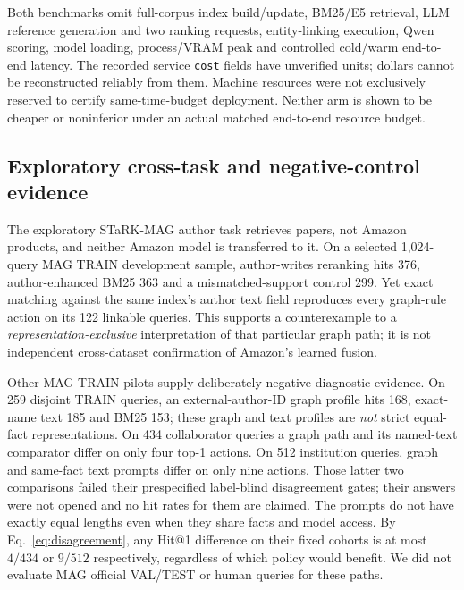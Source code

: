  Both benchmarks omit full-corpus index build/update, BM25/E5 retrieval,
 LLM reference generation and two ranking requests, entity-linking
 execution, Qwen scoring, model loading, process/VRAM peak and controlled
 cold/warm end-to-end latency. The recorded service \texttt{cost} fields
 have unverified units; dollars cannot be reconstructed reliably from
 them. Machine resources were not exclusively reserved to certify
 same-time-budget deployment. Neither arm is shown to be cheaper or
 noninferior under an actual matched end-to-end resource budget.

 \subsection{Exploratory cross-task and negative-control evidence}\label{app:mag}
 The exploratory STaRK-MAG author task retrieves papers, not Amazon
 products, and neither Amazon model is transferred to it. On a selected
 1,024-query MAG TRAIN development sample, author-writes reranking
 hits 376, author-enhanced BM25 363 and a mismatched-support control
 299. Yet exact matching against the same index's author text field
 reproduces every graph-rule action on its 122 linkable queries. This
 supports a counterexample to a \emph{representation-exclusive}
 interpretation of that particular graph path; it is not independent
 cross-dataset confirmation of Amazon's learned fusion.

 Other MAG TRAIN pilots supply deliberately negative diagnostic evidence.
 On 259 disjoint TRAIN queries, an external-author-ID graph profile hits
 168, exact-name text 185 and BM25 153; these graph and text profiles are
 \emph{not} strict equal-fact representations. On 434 collaborator
 queries a graph path and its named-text comparator differ on only four
 top-1 actions. On 512 institution queries, graph and same-fact text
 prompts differ on only nine actions. Those latter two comparisons failed
 their prespecified label-blind disagreement gates; their answers were
 not opened and no hit rates for them are claimed. The prompts do not
 have exactly equal lengths even when they share facts and model access.
 By Eq.~\eqref{eq:disagreement}, any Hit@1 difference on their fixed
 cohorts is at most $4/434$ or $9/512$ respectively, regardless of
 which policy would benefit. We did not evaluate MAG official VAL/TEST
 or human queries for these paths.

\clearpage
